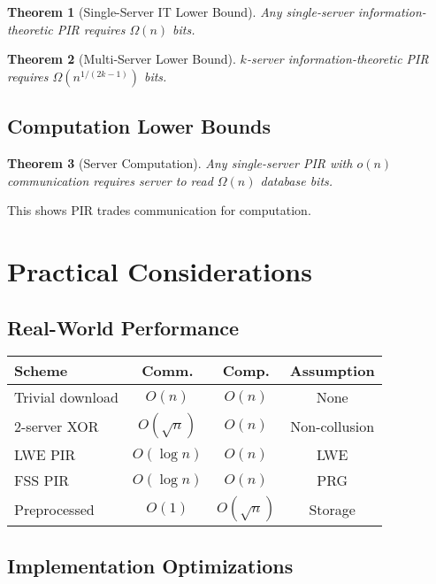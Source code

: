 \documentclass[11pt,final,hidelinks]{article}
\newtheorem{theorem}{Theorem}[section]
\begin{document}
\begin{theorem}[Single-Server IT Lower Bound]
Any single-server information-theoretic PIR requires $\Omega(n)$ bits.
\end{theorem}

\begin{theorem}[Multi-Server Lower Bound]
$k$-server information-theoretic PIR requires $\Omega(n^{1/(2k-1)})$ bits.
\end{theorem}

\subsection{Computation Lower Bounds}

\begin{theorem}[Server Computation]
Any single-server PIR with $o(n)$ communication requires server to read $\Omega(n)$ database bits.
\end{theorem}

This shows PIR trades communication for computation.

\section{Practical Considerations}

\subsection{Real-World Performance}

\begin{center}
\begin{tabular}{lccc}
\toprule
\textbf{Scheme} & \textbf{Comm.} & \textbf{Comp.} & \textbf{Assumption} \\
\midrule
Trivial download & $O(n)$ & $O(n)$ & None \\
2-server XOR & $O(\sqrt{n})$ & $O(n)$ & Non-collusion \\
LWE PIR & $O(\log n)$ & $O(n)$ & LWE \\
FSS PIR & $O(\log n)$ & $O(n)$ & PRG \\
Preprocessed & $O(1)$ & $O(\sqrt{n})$ & Storage \\
\bottomrule
\end{tabular}
\end{center}

\subsection{Implementation Optimizations}
\end{document}
